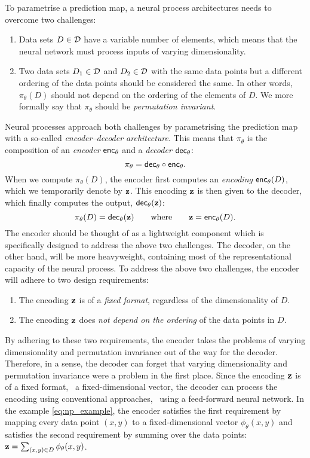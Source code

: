 \documentclass[12pt, twoside]{report}
\begin{document}
To parametrise a prediction map, a neural process architectures needs to overcome two challenges:
\begin{enumerate}
    \item
        Data sets $D \in \mathcal{D}$ have a variable number of elements, which means that the neural network must process inputs of varying dimensionality.
    \item 
        Two data sets $D_1 \in \mathcal{D}$ and $D_2 \in \mathcal{D}$ with the same data points but a different ordering of the data points should be considered the same.
        In other words, $\pi_\theta(D)$ should not depend on the ordering of the elements of $D$.
        We more formally say that $\pi_\theta$ should be \emph{permutation invariant}.
\end{enumerate}
Neural processes approach both challenges by parametrising the prediction map with a so-called \emph{encoder--decoder architecture}.
This means that $\pi_\theta$ is the composition of an \emph{encoder} $\mathsf{enc}_\theta$ and a \emph{decoder} $\mathsf{dec}_\theta$:
\begin{equation}
    \pi_\theta = \mathsf{dec}_\theta \circ \mathsf{enc}_\theta.
\end{equation}
When we compute $\pi_\theta(D)$, the encoder first computes an \emph{encoding} $\mathsf{enc}_\theta(D)$, which we temporarily denote by $\mathbf{z}$.
This encoding $\mathbf{z}$ is then given to the decoder, which finally computes the output, $\mathsf{dec}_\theta(\mathbf{z})$:
\begin{equation}
    \pi_\theta(D) = \mathsf{dec}_\theta(\mathbf{z})
    \qquad\text{where}\qquad
    \mathbf{z} = \mathsf{enc}_\theta(D).
\end{equation}
The encoder should be thought of as a lightweight component which is specifically designed to address the above two challenges.
The decoder, on the other hand, will be more heavyweight, containing most of the representational capacity of the neural process.
To address the above two challenges, the encoder will adhere to two design requirements:
\begin{enumerate}
    \item 
        The encoding $\mathbf{z}$ is of a \emph{fixed format}, regardless of the dimensionality of $D$.
    \item
        The encoding $\mathbf{z}$ does \emph{not depend on the ordering} of the data points in $D$.
\end{enumerate}

By adhering to these two requirements, the encoder takes the problems of varying dimensionality and permutation invariance out of the way for the decoder.
Therefore, in a sense, the decoder can forget that varying dimensionality and permutation invariance were a problem in the first place.
Since the encoding $\mathbf{z}$ is of a fixed format, \eg~a fixed-dimensional vector, the decoder can process the encoding using conventional approaches, \eg~using a feed-forward neural network.
In the example \eqref{eq:np_example}, the encoder satisfies the first requirement by mapping every data point $(x, y)$ to a fixed-dimensional vector $\phi_\theta(x, y)$ and satisfies the second requirement by summing over the data points: $\mathbf{z} = \sum_{(x, y) \in D} \phi_\theta(x, y)$.
\end{document}
